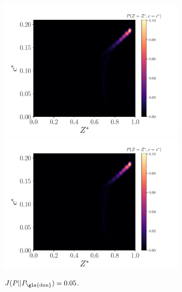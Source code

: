 \documentclass[review]{elsarticle}
\begin{document}
\begin{figure}[!tbp]%
  \centering%
  \begin{subfigure}[t]{0.32\textwidth}%
    \includegraphics[page=3,width=\textwidth]{./figs/pdfs_66089.pdf}\\%
    \includegraphics[page=4,width=\textwidth]{./figs/pdfs_66089.pdf}%
    \caption{$J(P||P_{\text{\gls{dnn}}})=0.05$.}\label{fig:}%
  \end{subfigure}\hfill%
  \begin{subfigure}[t]{0.32\textwidth}%

\end{subfigure}
\end{figure}
\end{document}
